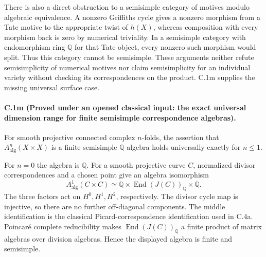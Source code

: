 There is also a direct obstruction to a semisimple category of
motives modulo algebraic equivalence. A nonzero Griffiths cycle
gives a nonzero morphism from a Tate motive to the appropriate
twist of $h(X)$, whereas composition with every morphism back is
zero by numerical triviality. In a semisimple category with
endomorphism ring $\mathbb Q$ for that Tate object, every nonzero
such morphism would split. Thus this category cannot be semisimple.
These arguments neither refute semisimplicity of numerical motives
nor claim semisimplicity for an individual variety without checking
its correspondences on the product. C.1m supplies the missing
universal surface case.

\paragraph{C.1m (Proved under an opened classical input: the exact universal
dimension range for finite semisimple correspondence algebras).}
For smooth projective connected complex $n$-folds, the assertion
that $A^n_{\mathrm{alg}}(X\times X)$ is a finite semisimple
$\mathbb Q$-algebra holds universally exactly for $n\le1$.

For $n=0$ the algebra is $\mathbb Q$. For a smooth projective
curve $C$, normalized divisor correspondences and a chosen point
give an algebra isomorphism
\[
 A^1_{\mathrm{alg}}(C\times C)
    \simeq\mathbb Q\times\operatorname{End}(J(C))_{\mathbb Q}
                        \times\mathbb Q.
\]
The three factors act on $H^0,H^1,H^2$, respectively. The
divisor cycle map is injective, so there are no further
off-diagonal components. The middle identification is the
classical Picard-correspondence identification used in C.4a.
Poincar\'e complete reducibility makes
$\operatorname{End}(J(C))_{\mathbb Q}$ a finite product of matrix
algebras over division algebras. Hence the displayed algebra
is finite and semisimple.

